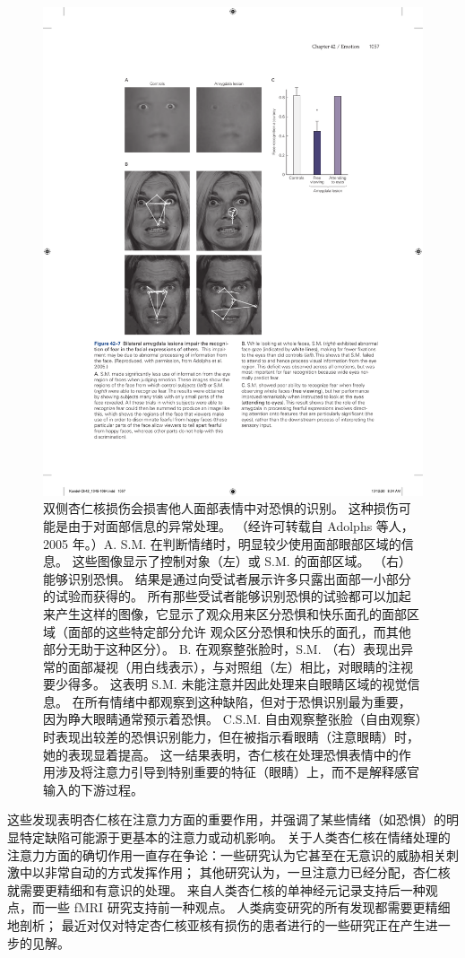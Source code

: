 \begin{figure}[htbp]
	\centering
	\includegraphics[width=0.75\linewidth]{chap42/fig_42_7}
	\caption{双侧杏仁核损伤会损害他人面部表情中对恐惧的识别。 这种损伤可能是由于对面部信息的异常处理。 （经许可转载自 Adolphs 等人，2005 年。）A. S.M. 在判断情绪时，明显较少使用面部眼部区域的信息。 这些图像显示了控制对象（左）或 S.M. 的面部区域。 （右）能够识别恐惧。 结果是通过向受试者展示许多只露出面部一小部分的试验而获得的。 所有那些受试者能够识别恐惧的试验都可以加起来产生这样的图像，它显示了观众用来区分恐惧和快乐面孔的面部区域（面部的这些特定部分允许 观众区分恐惧和快乐的面孔，而其他部分无助于这种区分）。 B. 在观察整张脸时，S.M. （右）表现出异常的面部凝视（用白线表示），与对照组（左）相比，对眼睛的注视要少得多。 这表明 S.M. 未能注意并因此处理来自眼睛区域的视觉信息。 在所有情绪中都观察到这种缺陷，但对于恐惧识别最为重要，因为睁大眼睛通常预示着恐惧。 C.S.M. 自由观察整张脸（自由观察）时表现出较差的恐惧识别能力，但在被指示看眼睛（注意眼睛）时，她的表现显着提高。 这一结果表明，杏仁核在处理恐惧表情中的作用涉及将注意力引导到特别重要的特征（眼睛）上，而不是解释感官输入的下游过程。}
	\label{fig:42_7}
\end{figure}

这些发现表明杏仁核在注意力方面的重要作用，并强调了某些情绪（如恐惧）的明显特定缺陷可能源于更基本的注意力或动机影响。 关于人类杏仁核在情绪处理的注意力方面的确切作用一直存在争论：一些研究认为它甚至在无意识的威胁相关刺激中以非常自动的方式发挥作用； 其他研究认为，一旦注意力已经分配，杏仁核就需要更精细和有意识的处理。 来自人类杏仁核的单神经元记录支持后一种观点，而一些 fMRI 研究支持前一种观点。 人类病变研究的所有发现都需要更精细地剖析； 最近对仅对特定杏仁核亚核有损伤的患者进行的一些研究正在产生进一步的见解。


